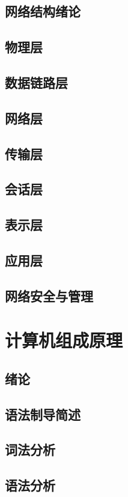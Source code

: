 \documentclass[UTF8]{ctexbook}
\begin{document}
        \section{网络结构绪论}
        \section{物理层}
        \section{数据链路层}
        \section{网络层}
        \section{传输层}
        \section{会话层}
        \section{表示层}
        \section{应用层}
        \section{网络安全与管理}
    \newpage
    \chapter{计算机组成原理}
        \section{绪论}
        \section{语法制导简述}
        \section{词法分析}
        \section{语法分析}
\end{document}
